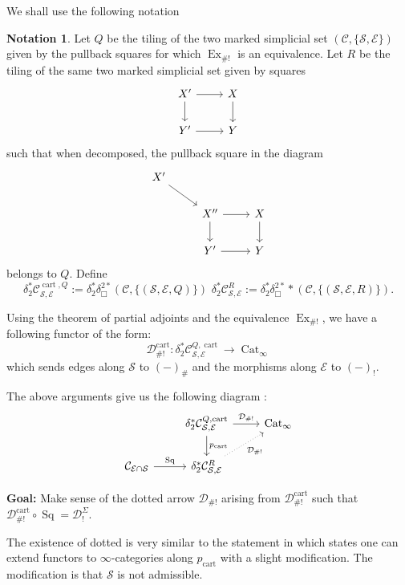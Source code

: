 \documentclass[14pt]{article}
\theoremstyle{definition}
\newtheorem{notation}[theorem]{Notation}
\newcommand{\E}{\mathcal{E}}
\newcommand{\D}{\mathcal{D}}
\newcommand{\op}[1]{\operatorname{#1}}
\renewcommand{\S}{\mathcal{S}}
\newcommand{\dd}{\delta}
\newcommand{\Ca}{\mathcal{C}}
\numberwithin{subsection}{section}
\begin{document}
\begin{enumerate}
\item
We shall use the following notation 
\begin{notation}\label{generalpullbackbasechangenotation}
Let $Q$ be the tiling of the two marked simplicial set $(\Ca,\{\S,\E\})$ given by the pullback squares for which $\op{Ex}_{\#!}$ is an equivalence. Let $R$ be the tiling of the same two marked simplicial set given by squares 
\begin{equation}
    \begin{tikzcd}
        X' \arrow[r]\arrow[d] & X \arrow[d]\\
        Y' \arrow[r] & Y
    \end{tikzcd}
\end{equation}
such that when decomposed, the pullback square in the diagram 
\begin{equation}
    \begin{tikzcd}
        X' \arrow[dr] & {} & {}\\
        {} & X'' \arrow[r] \arrow[d] & X \arrow[d] \\
        {} & Y' \arrow[r]  & Y
    \end{tikzcd}
\end{equation}
belongs to $Q$. Define
\begin{equation}
    \dd^*_2\Ca^{\op{cart},Q}_{\S,\E}:= \dd^*_2 \dd^{2*}_{\Box}(\Ca,\{(\S,\E,Q)\}) \,\, \dd^*_2\Ca^{R}_{\S,\E}:= \dd^*_2\dd^{2*}_{\Box}*(\Ca,\{(\S,\E,R)\}) .
\end{equation}
\item   Using the theorem of partial adjoints and the equivalence $\op{Ex}_{\#!}$, we have a following functor of the form:
\begin{equation}
\D^{\op{cart}}_{\#!} : \dd^*_2 \Ca^{Q,\op{cart}}_{\mathcal{S},\E} \to \op{Cat}_{\infty}
\end{equation}
which sends edges along $\mathcal{S}$ to $(-)_{\#}$ and the morphisms along $\E$ to $(-)_!$.
\item The above arguments give us the following diagram :
\begin{equation}
    \begin{tikzcd}
        {} & \dd^*_2 \Ca^{Q,\op{cart}}_{\mathcal{S},\E} \arrow[r,"\D_{\#!}"] \arrow[d,"p_{\op{cart}}"] & \op{Cat}_{\infty} \\
        \Ca_{\E \cap \S} \arrow[r,"\op{Sq}"] & \dd^*_2\Ca^R_{\mathcal{S},\E} \arrow[ur,dotted,"\D_{\#!}",swap] & {}
    \end{tikzcd}
\end{equation}
\end{notation}
\item \textbf{Goal:} Make sense of the dotted arrow $\D_{\#!}$ arising from $\D^{\op{cart}}_{\#!}$ such that $\D^{\op{cart}}_{\#!} \circ \op{Sq} = \D^{\Sigma}_!$. 
\item The existence of dotted is very similar to the statement in \cite[Theorem 1.5.1]{liu2017enhanced} which states one can extend functors to $\infty$-categories along $p_{\op{cart}}$ with a slight modification. The modification is that $\mathcal{S}$ is not admissible. 

\end{enumerate}
\end{document}
